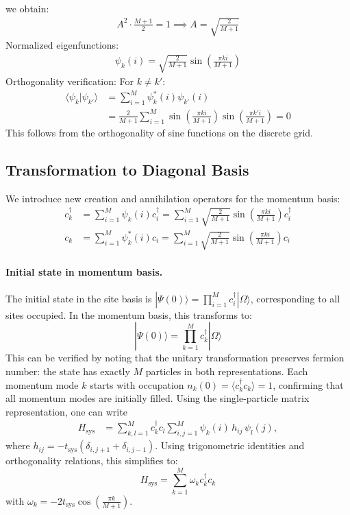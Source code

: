 \documentclass[12pt,oneside,openright]{report}
\theoremstyle{definition}
\theoremstyle{plain}
\theoremstyle{remark}
\begin{document}
we obtain:
\begin{align}
A^2 \cdot \frac{M+1}{2} = 1 \implies A = \sqrt{\frac{2}{M+1}}
\end{align}
Normalized eigenfunctions:
\begin{align}
\psi_k(i) = \sqrt{\frac{2}{M+1}} \sin\left(\frac{\pi k i}{M+1}\right) \label{eq:normalized_eigenfunctions}
\end{align}
Orthogonality verification:
For $k \neq k'$:
\begin{align}
\langle \psi_k | \psi_{k'} \rangle &= \sum_{i=1}^M \psi_k^*(i) \psi_{k'}(i) \nonumber\\
&= \frac{2}{M+1} \sum_{i=1}^M \sin\left(\frac{\pi k i}{M+1}\right) \sin\left(\frac{\pi k' i}{M+1}\right) = 0
\end{align}
This follows from the orthogonality of sine functions on the discrete grid.
\subsection{Transformation to Diagonal Basis}
We introduce new creation and annihilation operators for the momentum basis:
\begin{align}
c_k^\dagger &= \sum_{i=1}^M \psi_k(i) c_i^\dagger = \sum_{i=1}^M \sqrt{\frac{2}{M+1}} \sin\left(\frac{\pi k i}{M+1}\right) c_i^\dagger \label{eq:ck_definition}\\
c_k &= \sum_{i=1}^M \psi_k^*(i) c_i = \sum_{i=1}^M \sqrt{\frac{2}{M+1}} \sin\left(\frac{\pi k i}{M+1}\right) c_i \label{eq:ck_annihilation}
\end{align}

\paragraph{Initial state in momentum basis.}
The initial state in the site basis is $|\Psi(0)\rangle = \prod_{i=1}^M c_i^\dagger |\Omega\rangle$, corresponding to all sites occupied. In the momentum basis, this transforms to:
\begin{equation}
|\Psi(0)\rangle = \prod_{k=1}^M c_k^\dagger |\Omega\rangle
\end{equation}
This can be verified by noting that the unitary transformation preserves fermion number: the state has exactly $M$ 
particles in both representations. Each momentum mode $k$ starts with occupation $n_k(0) = \langle c_k^\dagger c_k \rangle = 1$, 
confirming that all momentum modes are initially filled.
Using the single-particle matrix representation, one can write
\begin{align}
H_{\text{sys}} &= \sum_{k,l=1}^M c_k^\dagger c_l \sum_{i,j=1}^M \psi_k(i)\, h_{ij}\, \psi_l(j),
\end{align}
where \(h_{ij}=-t_{\mathrm{sys}}(\delta_{i,j+1}+\delta_{i,j-1})\).
Using trigonometric identities and orthogonality relations, this simplifies to:
\begin{equation}
H_{\text{sys}} = \sum_{k=1}^M \omega_k c_k^\dagger c_k
\end{equation}
with $\omega_k = -2 t_{\text{sys}} \cos\left(\frac{\pi k}{M+1}\right)$.
\end{document}
